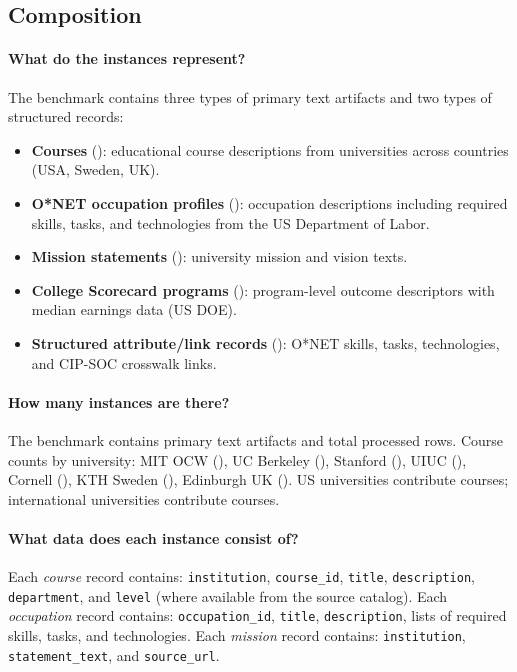 \subsection{Composition}

\paragraph{What do the instances represent?}
The benchmark contains three types of primary text artifacts and two types of structured records:
\begin{itemize}
  \item \textbf{Courses} (\NumCourses): educational course descriptions from \NumUniversities{} universities across \NumCountries{} countries (USA, Sweden, UK).
  \item \textbf{O*NET occupation profiles} (\NumOccupations): occupation descriptions including required skills, tasks, and technologies from the US Department of Labor.
  \item \textbf{Mission statements} (\NumMissionsExpanded): university mission and vision texts.
  \item \textbf{College Scorecard programs} (\NumScorecardPrograms): program-level outcome descriptors with median earnings data (US DOE).
  \item \textbf{Structured attribute/link records} (\NumAttributeRecords): O*NET skills, tasks, technologies, and CIP-SOC crosswalk links.
\end{itemize}

\paragraph{How many instances are there?}
The benchmark contains \NumPrimaryArtifacts{} primary text artifacts and \NumProcessedRows{} total processed rows.
Course counts by university:
MIT OCW (\NumMIT),
UC Berkeley (\NumUCB),
Stanford (\NumStanford),
UIUC (\NumUIUC),
Cornell (\NumCornell),
KTH Sweden (\NumKTH),
Edinburgh UK (\NumEdinburgh).
US universities contribute \NumUSCourses{} courses; international universities contribute \NumIntlCourses{} courses.

\paragraph{What data does each instance consist of?}
Each \emph{course} record contains: \texttt{institution}, \texttt{course\_id}, \texttt{title}, \texttt{description}, \texttt{department}, and \texttt{level} (where available from the source catalog).
Each \emph{occupation} record contains: \texttt{occupation\_id}, \texttt{title}, \texttt{description}, lists of required skills, tasks, and technologies.
Each \emph{mission} record contains: \texttt{institution}, \texttt{statement\_text}, and \texttt{source\_url}.

